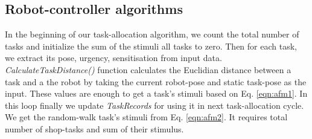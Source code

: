 \documentclass[final,5p,times,twocolumn]{elsarticle}
\begin{document}
\subsection{Robot-controller algorithms}
\label{ss:rcc-alg}
In the beginning of our task-allocation algorithm, we count the total number of tasks and initialize the sum of the stimuli all tasks to zero. Then for each task, we extract its pose, urgency, sensitisation from input data.\\  \textit{CalculateTaskDistance()} function calculates the Euclidian distance between a task and a the robot by taking the current robot-pose and static task-pose as the input. These values are enough to get a task's stimuli based on Eq. \ref{eqn:afm1}. In this loop finally we update \textit{TaskRecords} for using it in next task-allocation cycle. We get the random-walk task's stimuli from Eq. \ref{eqn:afm2}. It requires total number of shop-tasks and sum of their stimulus.\\
\end{document}
